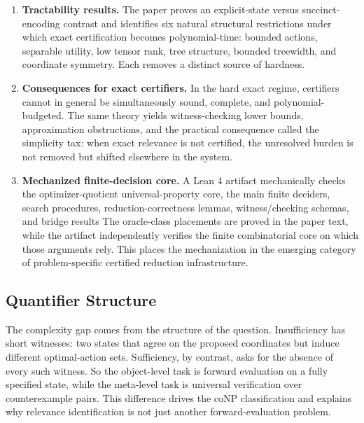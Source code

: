 \begin{enumerate}
\item \textbf{Tractability results.} The paper proves an explicit-state versus succinct-encoding contrast and identifies six natural structural restrictions under which exact certification becomes polynomial-time: bounded actions, separable utility, low tensor rank, tree structure, bounded treewidth, and coordinate symmetry. Each removes a distinct source of hardness.

\item \textbf{Consequences for exact certifiers.} In the hard exact regime, certifiers cannot in general be simultaneously sound, complete, and polynomial-budgeted. The same theory yields witness-checking lower bounds, approximation obstructions, and the practical consequence called the simplicity tax: when exact relevance is not certified, the unresolved burden is not removed but shifted elsewhere in the system.

\item \textbf{Mechanized finite-decision core.} A Lean 4 artifact mechanically checks the optimizer-quotient universal-property core, the main finite deciders, search procedures, reduction-correctness lemmas, witness/checking schemas, and bridge results  The oracle-class placements are proved in the paper text, while the artifact independently verifies the finite combinatorial core on which those arguments rely. This places the mechanization in the emerging category of problem-specific certified reduction infrastructure.

\end{enumerate}

\subsection{Quantifier Structure}
 
The complexity gap comes from the structure of the question. Insufficiency has short witnesses: two states that agree on the proposed coordinates but induce different optimal-action sets. Sufficiency, by contrast, asks for the absence of every such witness. So the object-level task is forward evaluation on a fully specified state, while the meta-level task is universal verification over counterexample pairs. This difference drives the coNP classification and explains why relevance identification is not just another forward-evaluation problem.


